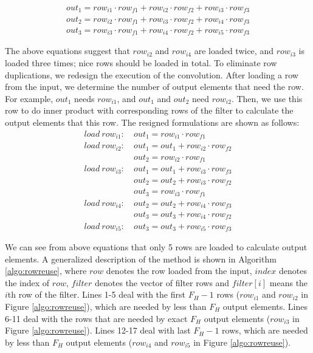 \begin{gather*}
  out_1=row_{i1} \cdot row_{f1} + row_{i2} \cdot row_{f2} + row_{i3} \cdot row_{f3} \\
out_{2}=row_{i2} \cdot row_{f1} + row_{i3} \cdot row_{f2} + row_{i4} \cdot row_{f3} \\
	out_{3}=row_{i3} \cdot row_{f1} + row_{i4} \cdot row_{f2} + row_{i5} \cdot row_{f3}
\end{gather*}

The above equations suggest that $row_{i2}$ and $row_{i4}$ are loaded twice, and $row_{i3}$ is loaded three times; nice rows should be loaded in total. To eliminate row duplications, we redesign the execution of the convolution. After loading a row from the input, we determine the number of output elements that need the row. For example, $out_1$ needs $row_{i1}$, and $out_1$ and $out_2$ need $row_{i2}$. Then, we use
this row to do inner product with corresponding rows of the filter to calculate the output elements that this row. The resigned formulations are shown as follows:
\begin{equation}\nonumber
\begin{aligned}
load\ row_{i1}:
&\ out_1=row_{i1} \cdot row_{f1} \\
load\ row_{i2}:
&\ out_1 = out_1+row_{i2} \cdot row_{f2}\\
&\ out_2=row_{i2} \cdot row_{f1}\\
load\ row_{i3}:
&\ out_1 = out_1+row_{i3} \cdot row_{f3}\\
&\ out_2 = out_2+row_{i3} \cdot row_{f2}\\
&\ out_{3}=row_{i3} \cdot row_{f1}\\
load\ row_{i4}:
&\ out_2=out_2+row_{i4} \cdot row_{f3} \\
&\ out_3=out_3+row_{i4} \cdot row_{f2}\\
load\ row_{i5}:
&\ out_3=out_3+row_{i5} \cdot row_{f3}
\end{aligned}	
\end{equation}



We can see from above equations that only 5 rows are loaded to calculate output elements. A generalized description of the method is
shown in Algorithm \ref{algo:rowreuse}, where $row$ denotes the row loaded from the input, $index$ denotes the index of $row$, $filter$ denotes
the vector of filter rows and $filter[i]$ means the $i$th row of the filter. Lines 1-5 deal with the first $F_H-1$ rows ($row_{i1}$ and $row_{i2}$ in Figure \ref{algo:rowreuse}), which
are needed by less than $F_H$ output elements. Lines 6-11 deal with the rows that are needed by exact $F_H$ output elements ($row_{i3}$ in
Figure \ref{algo:rowreuse}). Lines 12-17 deal with last $F_H-1$ rows, which are needed by less than $F_H$ output elements ($row_{i4}$
and $row_{i5}$ in Figure \ref{algo:rowreuse}).

